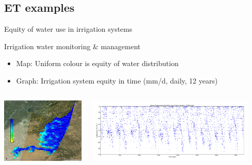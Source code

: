 \documentclass[xcolor=dvipsnames,beamer]{beamer} %
\begin{document}
\subsection{ET examples}
\begin{frame}[fragile]{Equity of water use in irrigation systems}

Irrigation water monitoring \& management
\begin{itemize}
 \item Map: Uniform colour is equity of water distribution
 \item Graph: Irrigation system equity in time (mm/d, daily, 12 years)
\end{itemize}

\begin{columns}[l]
\begin{center}
\includegraphics[width=4cm]{fess2012ef}
\end{center}

\begin{flushright}
  \includegraphics[width=8cm]{fess2012meaneftemporal}
\end{flushright}
\end{columns}
\end{frame}
\end{document}
